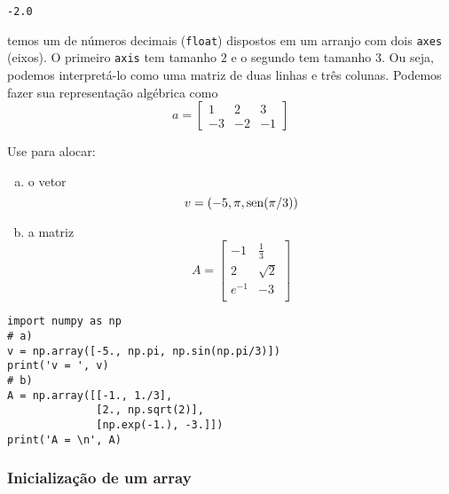 \begin{verbatim}
-2.0
\end{verbatim}

temos um {\PYTHONnumpyDOTarray} de números decimais (\texttt{float}) dispostos em um arranjo com dois \texttt{axes} (eixos). O primeiro \texttt{axis} tem tamanho $2$ e o segundo tem tamanho $3$. Ou seja, podemos interpretá-lo como uma matriz de duas linhas e três colunas. Podemos fazer sua representação algébrica como
\begin{equation}
  a =
  \begin{bmatrix}
    1 & 2 & 3\\
    -3 & -2 & -1 
  \end{bmatrix}
\end{equation}

\begin{exer}
Use {\PYTHONnumpyDOTarray} para alocar:
\begin{enumerate}[a)]
  \item o vetor
  \begin{equation}
    v = \left(-5, \pi, \operatorname{sen}(\pi/3)\right)
  \end{equation}
  \item a matriz
  \begin{equation}
    A = \begin{bmatrix}
    -1 & \displaystyle\frac{1}{3}\\[1em]
    2 & \displaystyle\sqrt{2}\\[1em]
    \displaystyle e^{-1} & -3\\
    \end{bmatrix}
  \end{equation}
\end{enumerate}
\end{exer}
\begin{resp}
  
\begin{lstlisting}
import numpy as np
# a)
v = np.array([-5., np.pi, np.sin(np.pi/3)])
print('v = ', v)
# b)
A = np.array([[-1., 1./3],
              [2., np.sqrt(2)],
              [np.exp(-1.), -3.]])
print('A = \n', A)  
\end{lstlisting}

\end{resp}

\subsubsection{Inicialização de um array}\label{subsubsection:iniarray}

